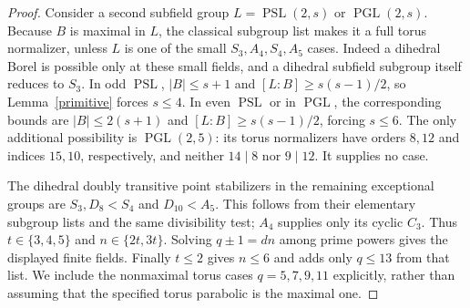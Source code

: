 \documentclass[11pt,a4paper]{article}
\newcommand{\PSL}{\operatorname{PSL}}\newcommand{\PGL}{\operatorname{PGL}}
\begin{document}
\begin{proof}
Consider a second subfield group $L=\PSL(2,s)$ or $\PGL(2,s)$.
Because $B$ is maximal in $L$, the classical subgroup list makes it a full
torus normalizer, unless $L$ is one of the small $S_3,A_4,S_4,A_5$ cases.
Indeed a dihedral Borel is possible only at these small fields, and a
dihedral subfield subgroup itself reduces to $S_3$. In odd $\PSL$,
$|B|\le s+1$ and $[L:B]\ge s(s-1)/2$, so Lemma~\ref{primitive}
forces $s\le4$. In even $\PSL$ or in $\PGL$, the corresponding bounds
are $|B|\le2(s+1)$ and $[L:B]\ge s(s-1)/2$, forcing $s\le6$.
The only additional possibility is $\PGL(2,5)$: its torus normalizers
have orders $8,12$ and indices $15,10$, respectively, and neither
$14\mid8$ nor $9\mid12$. It supplies no case.

The dihedral doubly transitive point stabilizers in the remaining exceptional
groups are $S_3,D_8<S_4$ and $D_{10}<A_5$. This follows from their
elementary subgroup lists and the same divisibility test; $A_4$ supplies
only its cyclic $C_3$. Thus $t\in\{3,4,5\}$ and $n\in\{2t,3t\}$.
Solving $q\pm1=dn$ among prime powers gives the displayed finite fields.
Finally $t\le2$ gives $n\le6$ and adds only $q\le13$ from that list.
We include the nonmaximal torus cases $q=5,7,9,11$ explicitly, rather than
assuming that the specified torus parabolic is the maximal one.
\end{proof}
\end{document}
